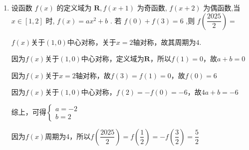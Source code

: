 \begin{enumerate}
\begin{jieda}
    因为$f(x)$关于$(1, 0)$中心对称，定义域为$\mathbf{R}$，所以$f(1) = 0$，故$k+b = 0$

    因为$f(x)$关于$x = 2$轴对称，故$f(3) = f(1) = 0$，故$f(0) = 8$
    
    因为$f(x)$关于$(1, 0)$中心对称，$f(2) = -f(0) = -8$，故$2k+b = -8$

    综上，可得$\left\{\begin{array}{l}
         k = -8 \\
         b = 8
    \end{array}\right.$
    
    因为$f(x)$周期为4，所以$f\left(\dfrac{2021}{2}\right) = f\left(\dfrac{5}{2}\right) = f\left(\dfrac{3}{2}\right) = -4$
    \end{jieda}
    \item 设函数 $f\left( x\right)$ 的定义域为 $\mathbf{R},f\left( {x + 1}\right)$ 为奇函数, $f\left( {x + 2}\right)$ 为偶函数,当 $x \in  \left\lbrack  {1,2}\right\rbrack$ 时, $f\left( x\right)  = a{x}^{2} + b$ . 若 $f\left( 0\right)  + f\left( 3\right)  = 6$ ,则 $f\left( \dfrac{2025}{2}\right)  =$
    \begin{jieda}
        $f(x)$关于$(1, 0)$中心对称，关于$x = 2$轴对称，故其周期为$4$.

        因为$f(x)$关于$(1, 0)$中心对称，定义域为$\mathbf{R}$，所以$f(1) = 0$，故$a+b = 0$

        因为$f(x)$关于$x = 2$轴对称，故$f(3) = f(1) = 0$，故$f(0) = 6$
        
        因为$f(x)$关于$(1, 0)$中心对称，$f(2) = -f(0) = -6$，故$4a+b = -6$

        综上，可得$\left\{\begin{array}{l}
             a = -2 \\
             b = 2
        \end{array}\right.$
        
        因为$f(x)$周期为4，所以$f\left(\dfrac{2025}{2}\right) = f\left(\dfrac{1}{2}\right) = -f\left(\dfrac{3}{2}\right) = \dfrac{5}{2}$
    \end{jieda}
\end{enumerate}
